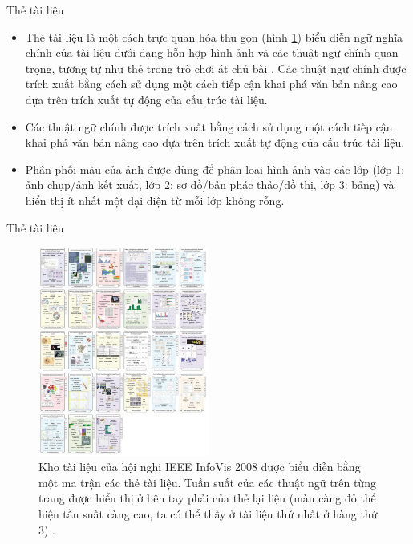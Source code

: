 \documentclass[10pt]{beamer}
\theoremstyle{remark}
\theoremstyle{definition}
\begin{document}
\begin{frame}{Thẻ tài liệu}
	\begin{itemize}
		\item Thẻ tài liệu là một cách trực quan hóa thu gọn (hình \ref{fig:12}) biểu diễn ngữ nghĩa chính của tài liệu dưới dạng hỗn hợp hình ảnh và các thuật ngữ chính quan trọng, tương tự như thẻ trong trò chơi át chủ bài \cite{400}.
		Các thuật ngữ chính được trích xuất bằng cách sử dụng một cách tiếp cận khai phá văn bản nâng cao dựa trên trích xuất tự động của cấu trúc tài liệu.
		\item Các thuật ngữ chính được trích xuất bằng cách sử dụng một cách tiếp cận khai phá văn bản nâng cao dựa trên trích xuất tự động của cấu trúc tài liệu.
		\item Phân phối màu của ảnh được dùng để phân loại hình ảnh vào các lớp (lớp 1: ảnh chụp/ảnh kết xuất, lớp 2: sơ đồ/bản phác thảo/đồ thị, lớp 3: bảng) và hiển thị ít nhất một đại diện từ mỗi lớp không rỗng.
	\end{itemize}
\end{frame}

\begin{frame}{Thẻ tài liệu}
	\begin{figure}[h!]
        \centering
        \includegraphics[width=0.5\textwidth]{12.png}
        \caption{Kho tài liệu của hội nghị IEEE InfoVis 2008 được biểu diễn bằng một ma trận các thẻ tài liệu.
        Tuần suất của các thuật ngữ trên từng trang được hiển thị ở bên tay phải của thẻ lại liệu (màu càng đỏ thể hiện tần suất càng cao, ta có thể thấy ở tài liệu thứ nhất ở hàng thứ 3) \cite{400}.}
        \label{fig:12}
    \end{figure}
\end{frame}
\end{document}
